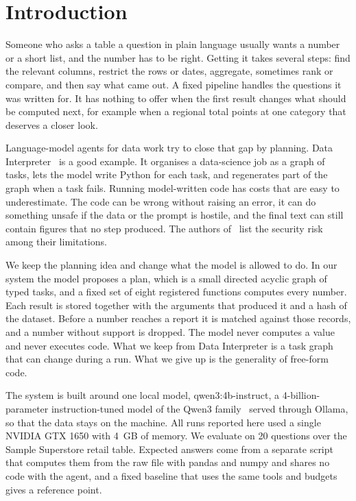 \section{Introduction}
Someone who asks a table a question in plain language usually wants a number or a short list, and the number has to be right. Getting it takes several steps: find the relevant columns, restrict the rows or dates, aggregate, sometimes rank or compare, and then say what came out. A fixed pipeline handles the questions it was written for. It has nothing to offer when the first result changes what should be computed next, for example when a regional total points at one category that deserves a closer look.

Language-model agents for data work try to close that gap by planning. Data Interpreter~\cite{hong2024datainterpreter} is a good example. It organises a data-science job as a graph of tasks, lets the model write Python for each task, and regenerates part of the graph when a task fails. Running model-written code has costs that are easy to underestimate. The code can be wrong without raising an error, it can do something unsafe if the data or the prompt is hostile, and the final text can still contain figures that no step produced. The authors of~\cite{hong2024datainterpreter} list the security risk among their limitations.

We keep the planning idea and change what the model is allowed to do. In our system the model proposes a plan, which is a small directed acyclic graph of typed tasks, and a fixed set of eight registered functions computes every number. Each result is stored together with the arguments that produced it and a hash of the dataset. Before a number reaches a report it is matched against those records, and a number without support is dropped. The model never computes a value and never executes code. What we keep from Data Interpreter is a task graph that can change during a run. What we give up is the generality of free-form code.

The system is built around one local model, qwen3:4b-instruct, a 4-billion-parameter instruction-tuned model of the Qwen3 family~\cite{yang2025qwen3} served through Ollama, so that the data stays on the machine. All runs reported here used a single NVIDIA GTX 1650 with 4~GB of memory. We evaluate on 20 questions over the Sample Superstore retail table. Expected answers come from a separate script that computes them from the raw file with pandas and numpy and shares no code with the agent, and a fixed baseline that uses the same tools and budgets gives a reference point.

